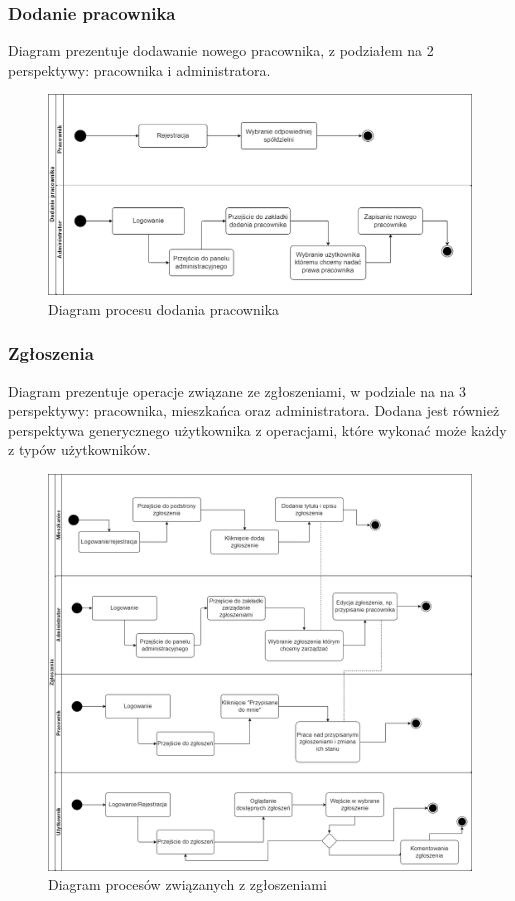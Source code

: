 \subsubsection{Dodanie pracownika}
Diagram prezentuje dodawanie nowego pracownika, z podziałem na 2 perspektywy: pracownika i administratora.
\begin{figure}[H]
    \centering
    \includegraphics[width=1\linewidth]{img/prac_dod_diag.png}
    \caption{Diagram procesu dodania pracownika}
    \label{fig:add-worker-diag}
\end{figure}
\subsubsection{Zgłoszenia}
Diagram prezentuje operacje związane ze zgłoszeniami, w podziale na na 3 perspektywy: pracownika, mieszkańca oraz administratora. Dodana jest również perspektywa generycznego użytkownika z operacjami, które wykonać może każdy z typów użytkowników.
\begin{figure}
    \centering
    \includegraphics[width=1\linewidth]{img/use_case_requests.png}
    \caption{Diagram procesów związanych z zgłoszeniami}
    \label{fig:request-diag}
\end{figure}